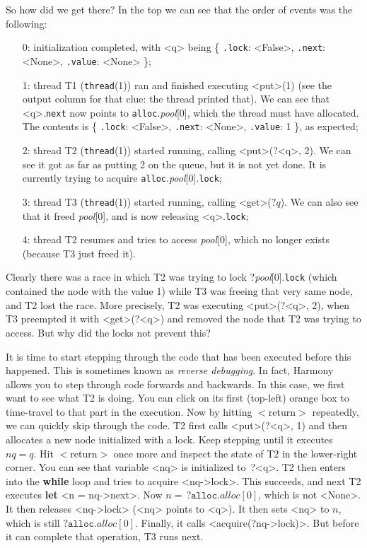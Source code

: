 \documentclass{report}
\begin{document}
So how did we get there?  In the top we can see that the order of
events was the following:
\begin{enumerate}
\item[0:] initialization completed, with <{q}> being
\{ \texttt{.lock}: <{False}>, \texttt{.next}: <{None}>, \texttt{.value}: <{None}> \};
\item[1:] thread T1 (\texttt{thread}(1)) ran and finished executing
<{put}>(1) (see the output column for that clue: the thread printed that).
We can see that <{q}>.\texttt{next} now points to \texttt{alloc}.\textit{pool}[0],
which the thread must have allocated.  The contents is 
\{ \texttt{.lock}: <{False}>, \texttt{.next}: <{None}>, \texttt{.value}: 1 \}, as expected;
\item[2:] thread T2 (\texttt{thread}(1)) started running, calling
<{put}>(?<{q}>, 2).  We can see it got as far as putting 2 on the queue,
but it is not yet done.  It is currently trying to acquire
\texttt{alloc}.\textit{pool}[0].\texttt{lock};
\item[3:] thread T3 (\texttt{thread}(1)) started running, calling
<{get}>($?q$).  We can also see that it freed \textit{pool}[0],
and is now releasing <{q}>.\texttt{lock};
\item[4:] thread T2 resumes and tries to access \textit{pool}[0], which
no longer exists (because T3 just freed it).
\end{enumerate}

Clearly there was a race in which T2 was trying to lock
?\textit{pool}[0].\texttt{lock} (which contained the node with the value 1)
while T3 was freeing that very same node, and T2 lost the race.
More precisely, T2 was executing <{put}>(?<{q}>, 2), when T3
preempted it with <{get}>(?<{q}>) and removed the node that T2
was trying to access.  But why did the locks not prevent this?

%
It is time to start stepping through the code that has been executed
before this happened.  This is sometimes known as
\emph{reverse debugging}.  In fact, Harmony allows you to step through
code forwards and backwards.  In this case, we first want to see what
T2 is doing.  You can click on its first (top-left) orange box to
time-travel to that part in the execution.  Now by hitting
$<$return$>$ repeatedly, we can quickly skip through the code.
T2 first calls <{put}>(?<{q}>, 1) and then allocates a new
node initialized with a lock.  Keep stepping until it executes
$\mathit{nq} = q$.  Hit $<$return$>$ once more and inspect the
state of T2 in the lower-right corner.  You can see that variable
<{nq}> is initialized to~?<{q}>.  T2 then enters into the
\textbf{while} loop and tries to acquire
<{nq->lock}>.  This succeeds, and
next T2 executes \textbf{let} <{n = nq->next}>.
Now $n =\,?\mathtt{alloc}.\mathit{alloc}[0]$, which is not <{None}>.
It then releases <{nq->lock}>
(<{nq}> points to <{q}>).  It then sets <{nq}> to $n$, which
is still $?\mathtt{alloc}.\mathit{alloc}[0]$.  Finally, it calls
<{acquire(?nq->lock)}>.
But before it can complete that operation, T3 runs next.
\end{document}
